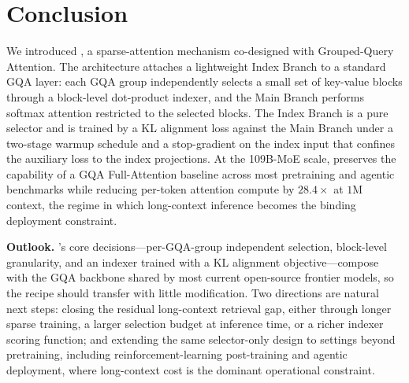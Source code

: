 \section{Conclusion}
\label{sec:conclusion}

We introduced \method{}, a sparse-attention mechanism co-designed with Grouped-Query Attention. The architecture attaches a lightweight Index Branch to a standard GQA layer: each GQA group independently selects a small set of key-value blocks through a block-level dot-product indexer, and the Main Branch performs softmax attention restricted to the selected blocks. The Index Branch is a pure selector and is trained by a KL alignment loss against the Main Branch under a two-stage warmup schedule and a stop-gradient on the index input that confines the auxiliary loss to the index projections. At the 109B-MoE scale, \method{} preserves the capability of a GQA Full-Attention baseline across most pretraining and agentic benchmarks while reducing per-token attention compute by $28.4\times$ at $1\mathrm{M}$ context, the regime in which long-context inference becomes the binding deployment constraint.

\textbf{Outlook.}
\method{}'s core decisions---per-GQA-group independent selection, block-level granularity, and an indexer trained with a KL alignment objective---compose with the GQA backbone shared by most current open-source frontier models, so the recipe should transfer with little modification. Two directions are natural next steps: closing the residual long-context retrieval gap, either through longer sparse training, a larger selection budget at inference time, or a richer indexer scoring function; and extending the same selector-only design to settings beyond pretraining, including reinforcement-learning post-training and agentic deployment, where long-context cost is the dominant operational constraint.
